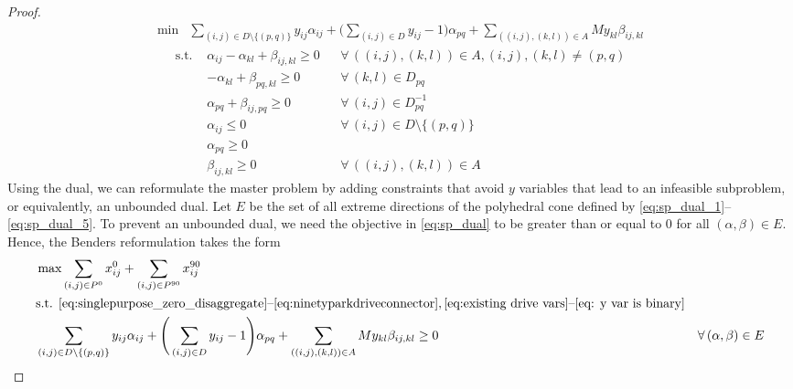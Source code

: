 \documentclass[10pt]{article}
\newcommand{\zeroparkvar}[2]{x^{0}_{#1#2}}
\newcommand{\ninetyparkvar}[2]{x^{90}_{#1#2}}
\newcommand{\drivevar}[2]{y_{#1#2}}
\newcommand{\validzeroparkset}{P^{0}}
\newcommand{\validninetyparkset}{P^{90}}
\newcommand{\validdriveset}{D}
\newcommand{\gridadjset}[2]{D_{#1#2}}
\newcommand{\gridinvadjset}[2]{D^{-1}_{#1#2}}
\newcommand{\gridarcset}{A}
\newcommand{\entrancex}{p}
\newcommand{\entrancey}{q}
\theoremstyle{definition}
\begin{document}
\begin{proof}
\begin{align}
     \min & \sum_{(i,j) \in \validdriveset \setminus \{(\entrancex, \entrancey)\}} \drivevar{i}{j} \alpha_{ij} + \Bigg(\sum_{(i,j) \in \validdriveset} \drivevar{i}{j} -1 \Bigg) \alpha_{pq} + \sum_{((i,j), (k,l)) \in \gridarcset}  M y_{kl} \beta_{ij, kl}  \label{eq:sp_dual}
\end{align}
\begin{align}
    \text{s.t. } & \alpha_{ij} - \alpha_{kl} + \beta_{ij, kl} \geq 0 && \forall \, ((i,j), (k,l)) \in \gridarcset, (i, j), (k, l) \neq (p, q)  \label{eq:sp_dual_1} \\
     & - \alpha_{kl} + \beta_{pq, kl} \geq 0 && \forall \,  (k, l) \in \gridadjset{p}{q}  \label{eq:sp_dual_2} \\
    & \alpha_{pq} + \beta_{ij, pq} \geq 0 && \forall \,  (i, j) \in \gridinvadjset{p}{q}  \label{eq:sp_dual_3} \\
    & \alpha_{ij} \leq 0 && \forall \, (i,j) \in \validdriveset \setminus \{(\entrancex, \entrancey)\} \label{eq:sp_dual_4} \\
    & \alpha_{pq} \geq 0 &&  \label{eq:sp_dual_4.5} \\
    & \beta_{ij, kl} \geq 0 && \forall \, ((i,j), (k,l)) \in \gridarcset \label{eq:sp_dual_5} 
\end{align}
Using the dual, we can reformulate the master problem by adding constraints that avoid $y$ variables that lead to an infeasible subproblem, or equivalently, an unbounded dual. Let $E$ be the set of all extreme directions of the polyhedral cone defined by \eqref{eq:sp_dual_1}--\eqref{eq:sp_dual_5}. To prevent an unbounded dual, we need the objective in \eqref{eq:sp_dual} to be greater than or equal to 0 for all $(\alpha, \beta) \in E$. Hence, the Benders reformulation takes the form
\begin{align}
    &\max \sum_{(i,j) \in \validzeroparkset} \zeroparkvar{i}{j} + \sum_{(i,j) \in \validninetyparkset} \ninetyparkvar{i}{j}   && \notag\\
     & \text{s.t. }  \eqref{eq:singlepurpose_zero_disaggregate} \text{--}\eqref{eq:ninetyparkdriveconnector}, \eqref{eq:existing drive vars} \text{--} \eqref{eq: y var is binary}  && \notag \\
     & \sum_{(i,j) \in \validdriveset \setminus \{(\entrancex, \entrancey)\}} \drivevar{i}{j} \alpha_{ij} + \Bigg(\sum_{(i,j) \in \validdriveset} \drivevar{i}{j} -1 \Bigg) \alpha_{pq} + \sum_{((i,j), (k,l)) \in \gridarcset}  M y_{kl} \beta_{ij, kl} \geq 0  && \forall \, (\alpha, \beta) \in E \label{eq:two_way_benders_feasibility_cut}
\end{align}


\end{proof}
\end{document}
